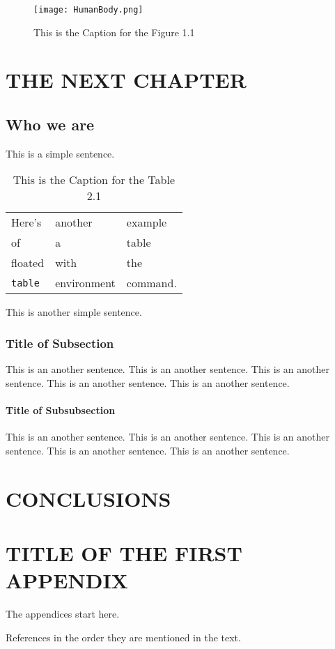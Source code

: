 \documentclass[a4paper, 12pt]{report}
\begin{document}
\begin{figure}[!h]
\begin{center}
\texttt{[image: HumanBody.png]}
\caption{This is the Caption for the Figure 1.1}
\end{center}
\end{figure}

\chapter{THE NEXT CHAPTER}
\section{Who we are}

This is a simple sentence.
\begin{table}[h]
\begin{center}
\begin{tabular}{lll}
Here's       & another     & example  \\
of           & a           & table    \\
floated      & with        & the      \\
\verb+table+ & environment & command.
\end{tabular}
\end{center}
\caption{This is the Caption for the Table 2.1}
\end{table}

This is another simple sentence.

\subsection{Title of Subsection}

This is an another sentence. This is an another sentence. This is an another sentence. This is an another sentence.
This is an another sentence.

\subsubsection{Title of Subsubsection}

This is an another sentence. This is an another sentence. This is an another sentence. This is an another sentence.
This is an another sentence.

\chapter{CONCLUSIONS}


\appendix

\chapter{TITLE OF THE FIRST APPENDIX}
The appendices start here.

\begin{thebibliography}{9}
 References in the order they are mentioned in the text.
\end{thebibliography}
\end{document}
